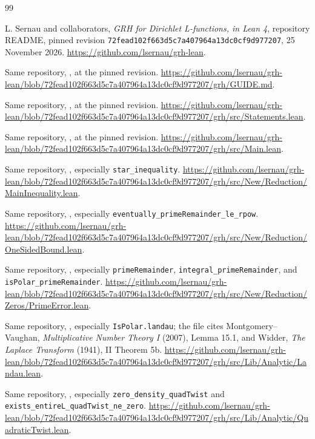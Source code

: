 \documentclass[11pt]{article}
\theoremstyle{definition}
\begin{document}
\begin{thebibliography}{99}\small\raggedright
{}
L. Sernau and collaborators, \emph{GRH for Dirichlet L-functions, in
Lean 4}, repository README, pinned revision
\texttt{72fead102f663d5c7a407964a13dc0cf9d977207}, 25 November 2026.
\url{https://github.com/lsernau/grh-lean}.

Same repository, , at the pinned revision.
\url{https://github.com/lsernau/grh-lean/blob/72fead102f663d5c7a407964a13dc0cf9d977207/grh/GUIDE.md}.

Same repository, , at the pinned revision.
\url{https://github.com/lsernau/grh-lean/blob/72fead102f663d5c7a407964a13dc0cf9d977207/grh/src/Statements.lean}.

Same repository, , at the pinned revision.
\url{https://github.com/lsernau/grh-lean/blob/72fead102f663d5c7a407964a13dc0cf9d977207/grh/src/Main.lean}.

Same repository, ,
especially \texttt{star\_inequality}.
\url{https://github.com/lsernau/grh-lean/blob/72fead102f663d5c7a407964a13dc0cf9d977207/grh/src/New/Reduction/MainInequality.lean}.

Same repository, ,
especially \texttt{eventually\_primeRemainder\_le\_rpow}.
\url{https://github.com/lsernau/grh-lean/blob/72fead102f663d5c7a407964a13dc0cf9d977207/grh/src/New/Reduction/OneSidedBound.lean}.

Same repository, ,
especially \texttt{primeRemainder}, \texttt{integral\_primeRemainder},
and \texttt{isPolar\_primeRemainder}.
\url{https://github.com/lsernau/grh-lean/blob/72fead102f663d5c7a407964a13dc0cf9d977207/grh/src/New/Reduction/Zeros/PrimeError.lean}.

Same repository, ,
especially \texttt{IsPolar.landau}; the file cites Montgomery--Vaughan,
\emph{Multiplicative Number Theory I} (2007), Lemma 15.1, and Widder,
\emph{The Laplace Transform} (1941), II Theorem 5b.
\url{https://github.com/lsernau/grh-lean/blob/72fead102f663d5c7a407964a13dc0cf9d977207/grh/src/Lib/Analytic/Landau.lean}.

Same repository, ,
especially \texttt{zero\_density\_quadTwist} and
\texttt{exists\_entireL\_quadTwist\_ne\_zero}.
\url{https://github.com/lsernau/grh-lean/blob/72fead102f663d5c7a407964a13dc0cf9d977207/grh/src/Lib/Analytic/QuadraticTwist.lean}.


\end{thebibliography}
\end{document}
